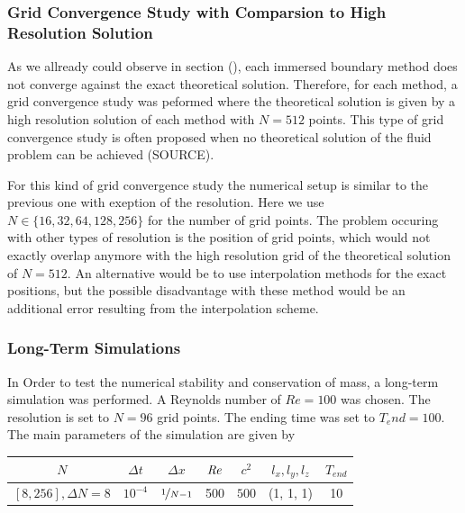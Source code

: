 \subsubsection{Grid Convergence Study with Comparsion to High Resolution Solution}

As we allready could observe in section (), each immersed boundary method does not converge against the exact theoretical solution.
Therefore, for each method, a grid convergence study was peformed where the theoretical solution is given by a
high resolution solution of each method with $N=512$ points. This type of grid convergence study is often proposed
when no theoretical solution of the fluid problem can be achieved (SOURCE).

For this kind of grid convergence study the numerical setup is similar to the previous one with exeption of the resolution.
Here we use $N\in\{16, 32, 64, 128, 256\}$ for the number of grid points.
The problem occuring with other types of resolution is the position of grid points, which would not exactly overlap anymore with
the high resolution grid  of the theoretical solution of $N=512$.
An alternative would be to use interpolation methods for the exact positions, but the possible disadvantage with these method
would be an additional error resulting from the interpolation scheme.\\

\subsubsection{Long-Term Simulations}

In Order to test the  numerical stability and conservation of mass, a long-term simulation was performed.
A Reynolds number of $Re=100$ was chosen. The resolution is set to $N=96$ grid points.
The ending time was set to $T_end=100$.
The main parameters of the simulation are  given by

\begin{center}
\vspace*{0.7ex}
\begin{tabular}{c|c|c|c|c|c|c }
 $ N  $                   & $\Delta t$ & $\Delta x$            & $\mbox{\textit{Re}}$  & $c^2$   & $l_x, l_y, l_z$ & $T_{end}$\\
\hline
 $[8, 256], \Delta N = 8 $& $10^{-4}$ & $\nicefrac{1}{N - 1}$ & 500     & $500$   & (1, 1, 1)       & 10\\
\end{tabular}
\vspace*{0.7ex}
\end{center}

